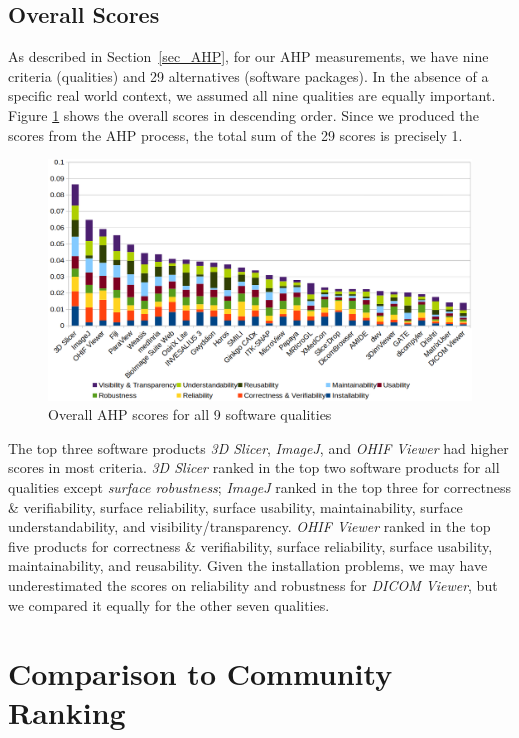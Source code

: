 \documentclass[final, 3p, times, authoryear]{elsarticle}
\begin{document}
\subsection{Overall Scores}

As described in Section~\ref{sec_AHP}, for our AHP measurements, we have nine
criteria (qualities) and 29 alternatives (software packages). In the absence of
a specific real world context, we assumed all nine qualities are equally
important. Figure \ref{fg_overall_scores} shows the overall scores in descending
order. Since we produced the scores from the AHP process, the total sum of the
29 scores is precisely 1.

\begin{figure}[!ht]
\includegraphics[scale=0.38]{figures/overall_scores.png}
\caption{Overall AHP scores for all 9 software qualities}

\label{fg_overall_scores}
\end{figure}

The top three software products \textit{3D Slicer}, \textit{ImageJ}, and
\textit{OHIF Viewer} had higher scores in most criteria. \textit{3D Slicer}
ranked in the top two software products for all qualities except \textit{surface
robustness}; \textit{ImageJ} ranked in the top three for correctness \&
verifiability, surface reliability, surface usability, maintainability, surface
understandability, and visibility/transparency. \textit{OHIF Viewer} ranked in
the top five products for correctness \& verifiability, surface reliability,
surface usability, maintainability, and reusability. Given the installation
problems, we may have underestimated the scores on reliability and robustness
for \textit{DICOM Viewer}, but we compared it equally for the other seven
qualities.

\section{Comparison to Community Ranking} \label{Sec_VsCommunityRanking}
\end{document}
